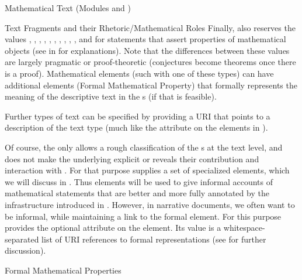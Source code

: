 \begin{tchapter}[id=mtxt,short=Mathematical Text]{Mathematical Text (Modules
  {} and {})}
\begin{tsection}[id=omtext]{Text Fragments and their Rhetoric/Mathematical Roles}
Finally, {\omdoc} also reserves the values {},
{}, {},
{}, {},
{}, {},
{}, {},
{}, {} and
{} for statements that assert properties of mathematical
objects (see {} in {} for
explanations). Note that the differences between these values are largely pragmatic or
proof-theoretic (conjectures become theorems once there is a proof).  Mathematical
{} elements (such with one of these types) can have additional
{} elements (Formal Mathematical Property) that formally represents the
meaning of the descriptive text in the {}s (if that is feasible).

Further types of text can be specified by providing a URI that points to a description of
the text type (much like the {} attribute on
the {} elements in {\cmathml}).

Of course, the {} only allows a rough classification of the
{s} at the text level, and does not make the underlying
{} explicit or reveals their contribution and interaction with
{}.  For that purpose {\omdoc} supplies a set of
specialized elements, which we will discuss in {}.  Thus
{} elements will be used to give informal accounts of mathematical
statements that are better and more fully annotated by the infrastructure introduced in
{}. However, in narrative documents, we often want to be informal,
while maintaining a link to the formal element. For this purpose {\omdoc} provides the
optional {} attribute on the {} element. Its
value is a whitespace-separated list of URI references to formal representations (see
{} for further discussion).
\end{tsection}

\begin{tsection}[id=FMP]{Formal Mathematical Properties}
  

\end{tsection}
\end{tchapter}
